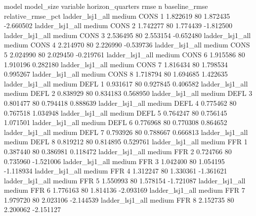               model model_size variable  horizon_quarters      rmse  n  baseline_rmse  relative_rmse_pct
    ladder_lsj1_all     medium     CONS                 1  1.822619 80       1.872435          -2.660502
    ladder_lsj1_all     medium     CONS                 2  1.742277 80       1.774439          -1.812500
    ladder_lsj1_all     medium     CONS                 3  2.536495 80       2.553154          -0.652480
    ladder_lsj1_all     medium     CONS                 4  2.214970 80       2.226990          -0.539736
    ladder_lsj1_all     medium     CONS                 5  2.024990 80       2.029450          -0.219761
    ladder_lsj1_all     medium     CONS                 6  1.915586 80       1.910196           0.282180
    ladder_lsj1_all     medium     CONS                 7  1.816434 80       1.798534           0.995267
    ladder_lsj1_all     medium     CONS                 8  1.718794 80       1.694685           1.422635
    ladder_lsj1_all     medium     DEFL                 1  0.931617 80       0.927845           0.406582
    ladder_lsj1_all     medium     DEFL                 2  0.838929 80       0.834183           0.568950
    ladder_lsj1_all     medium     DEFL                 3  0.801477 80       0.794418           0.888639
    ladder_lsj1_all     medium     DEFL                 4  0.775462 80       0.767518           1.034948
    ladder_lsj1_all     medium     DEFL                 5  0.764247 80       0.756145           1.071501
    ladder_lsj1_all     medium     DEFL                 6  0.776968 80       0.770308           0.864652
    ladder_lsj1_all     medium     DEFL                 7  0.793926 80       0.788667           0.666813
    ladder_lsj1_all     medium     DEFL                 8  0.819212 80       0.814895           0.529761
    ladder_lsj1_all     medium      FFR                 1  0.387440 80       0.386981           0.118472
    ladder_lsj1_all     medium      FFR                 2  0.724766 80       0.735960          -1.521006
    ladder_lsj1_all     medium      FFR                 3  1.042400 80       1.054195          -1.118934
    ladder_lsj1_all     medium      FFR                 4  1.312247 80       1.330361          -1.361621
    ladder_lsj1_all     medium      FFR                 5  1.550993 80       1.578154          -1.721087
    ladder_lsj1_all     medium      FFR                 6  1.776163 80       1.814136          -2.093169
    ladder_lsj1_all     medium      FFR                 7  1.979720 80       2.023106          -2.144539
    ladder_lsj1_all     medium      FFR                 8  2.152735 80       2.200062          -2.151127
